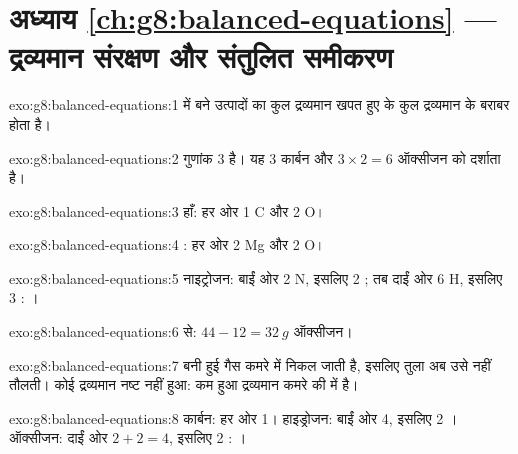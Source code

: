 \section*{अध्याय \ref{ch:g8:balanced-equations} --- द्रव्यमान संरक्षण और संतुलित समीकरण}

\begin{solution}{exo:g8:balanced-equations:1}
 में बने उत्पादों का कुल द्रव्यमान खपत हुए  के
कुल द्रव्यमान के बराबर होता है।
\end{solution}

\begin{solution}{exo:g8:balanced-equations:2}
गुणांक 3 है। यह 3 कार्बन  और $3 \times 2 = 6$
ऑक्सीजन  को दर्शाता है।
\end{solution}

\begin{solution}{exo:g8:balanced-equations:3}
हाँ: हर ओर 1 C और 2 O।
\end{solution}

\begin{solution}{exo:g8:balanced-equations:4}
: हर ओर 2 Mg और 2 O।
\end{solution}

\begin{solution}{exo:g8:balanced-equations:5}
नाइट्रोजन: बाईं ओर 2 N, इसलिए 2 ; तब दाईं ओर 6 H, इसलिए 3
: ।
\end{solution}

\begin{solution}{exo:g8:balanced-equations:6}
 से: $44 - 12 = \qty{32}{g}$ ऑक्सीजन।
\end{solution}

\begin{solution}{exo:g8:balanced-equations:7}
बनी हुई गैस कमरे में निकल जाती है, इसलिए तुला अब उसे नहीं तौलती। कोई
द्रव्यमान नष्ट नहीं हुआ: कम हुआ द्रव्यमान कमरे की  में है।
\end{solution}

\begin{solution}{exo:g8:balanced-equations:8}
कार्बन: हर ओर 1। हाइड्रोजन: बाईं ओर 4, इसलिए 2 । ऑक्सीजन:
दाईं ओर $2 + 2 = 4$, इसलिए 2 :
।
\end{solution}


